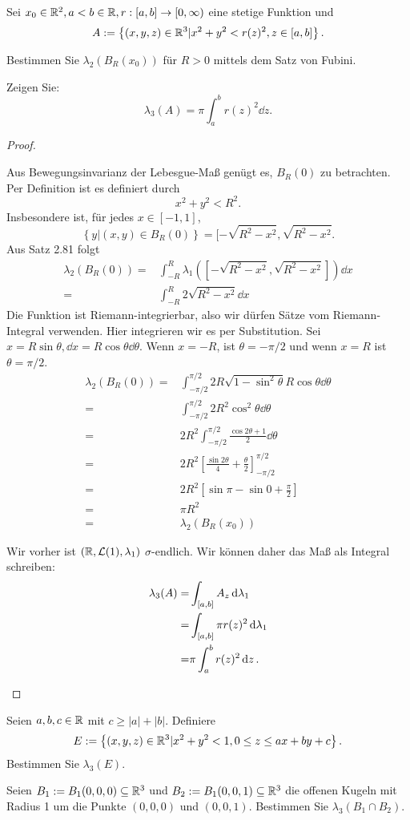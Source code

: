\begin{Problem}
	Sei $x_0\in \mathbb{R}^2,a<b\in \mathbb{R},r:[a,b]\to [0,\infty)$ eine stetige Funktion und
	\[
		A:=\left\{ (x,y,z)\in \mathbb{R}^3|x^2+y^2<r(z)^2,z\in [a,b] \right\} 
	.\] 
	\begin{parts}
	\item Bestimmen Sie $\lambda_2(B_R(x_0))$ f\"{u}r $R>0$ mittels dem Satz von Fubini.
	\item Zeigen Sie:
		\[
			\lambda_3(A)=\pi\int_a^b r(z)^2\dd{z}
		.\] 
	\end{parts}
\end{Problem}
\begin{proof}
	\begin{parts}
	\item Aus Bewegungsinvarianz der Lebesgue-Maß genügt es, $B_R(0)$ zu betrachten. Per Definition ist es definiert durch
		\[
		x^2+y^2<R^2
		.\]
		Insbesondere ist, f\"{u}r jedes $x\in [-1,1]$, 
			\[
			\left\{ y|(x,y)\in B_R(0) \right\} =[-\sqrt{R^2-x^2} ,\sqrt{R^2-x^2} 
			.\] 
			Aus Satz 2.81 folgt
			\begin{align*}
				\lambda_2(B_R(0))=&\int_{-R}^R \lambda_1([-\sqrt{R^2-x^2} ,\sqrt{R^2-x^2} ])\dd{x}\\
				=&\int_{-R}^R 2\sqrt{R^2-x^2} \dd{x}
			\end{align*}
			Die Funktion ist Riemann-integrierbar, also wir dürfen Sätze vom Riemann-Integral verwenden. Hier integrieren wir es per Substitution. Sei $x=R\sin\theta,\dd{x}=R\cos\theta\dd{\theta}$. Wenn $x=-R$, ist $\theta=-\pi / 2$ und wenn $x=R$ ist $\theta=\pi / 2$. 
			\begin{align*}
				\lambda_2(B_R(0))=&\int_{-\pi / 2}^{\pi / 2} 2R\sqrt{1-\sin^2\theta} R\cos\theta\dd{\theta}\\
				=&\int_{-\pi / 2}^{\pi / 2}2R^2\cos^2\theta\dd{\theta}\\
				=&2R^2\int_{-\pi / 2}^{\pi / 2}\frac{\cos 2\theta+1}{2}\dd{\theta}\\
				=&2R^2\left[ \frac{\sin 2\theta}{4}+\frac{\theta}{2} \right]_{-\pi / 2}^{\pi /2}\\
				=&2R^2\left[ \sin \pi - \sin 0 + \frac{\pi}{2} \right] \\
				=&\pi R^2\\
				=&\lambda_2(B_R(x_0))
			\end{align*}
		\item Wir vorher ist $(\mathbb{R}, \mathcal{L}(1), \lambda_1)$ $\sigma$-endlich. Wir können daher das Maß als Integral schreiben:
			\begin{align*}
				\lambda_3(A)=&\int_{[a,b]} A_z\dd{\lambda_1}\\
				=&\int_{[a,b]} \pi r(z)^2\dd{\lambda_1}\\
				=&\pi \int_a^b r(z)^2\dd{z}.\qedhere
			\end{align*}
	\end{parts}
\end{proof}
\begin{Problem}
	Seien $a,b,c\in \mathbb{R}$ mit $c\ge |a|+|b|$. Definiere
	\[
	E:=\left\{ (x,y,z)\in \mathbb{R}^3|x^2+y^2<1,0\le z\le ax+by+c \right\} 
	.\] 
	Bestimmen Sie $\lambda_3(E)$.
\end{Problem}

\begin{Problem}
	Seien $B_1:=B_1(0,0,0)\subseteq \mathbb{R}^3$ und $B_2:=B_1(0,0,1)\subseteq \mathbb{R}^3$ die offenen Kugeln mit Radius 1 um die Punkte $(0,0,0)$ und $(0,0,1)$. Bestimmen Sie $\lambda_3(B_1\cap B_2)$.
\end{Problem}
